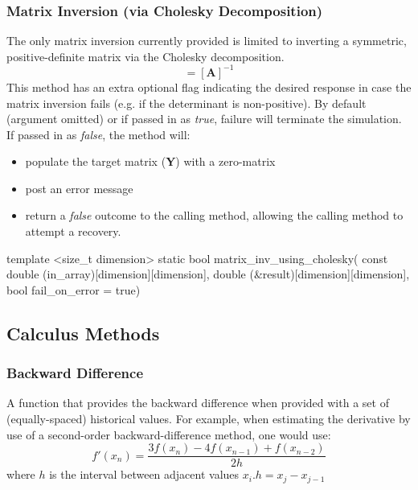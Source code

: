 \documentclass[11pt,fleqn]{report}
\begin{document}
\subsubsection{Matrix Inversion (via Cholesky Decomposition)}
The only matrix inversion currently provided is limited to inverting a
symmetric, positive-definite matrix via the Cholesky decomposition.
\begin{equation*}
[\textbf{Y}] = [\textbf{A}]^{-1}
\end{equation*}
This method has an extra optional flag indicating the desired response in
case the matrix inversion fails (e.g. if the
determinant is non-positive). By default (argument omitted) or if passed in as
\textit{true}, failure will terminate the simulation.
If passed in as \textit{false}, the method will:
\begin{itemize}
 \item populate the target matrix (\textbf{Y}) with a zero-matrix
 \item post an error message
 \item return a \textit{false} outcome to the calling method, allowing the
 calling method to attempt a recovery.
\end{itemize}

\begin{code}
template <size_t dimension>
static bool matrix_inv_using_cholesky(
            const double (in_array)[dimension][dimension],
            double (&result)[dimension][dimension],
            bool fail_on_error = true)
\end{code}

\subsection{Calculus Methods}


\subsubsection{Backward Difference}
A function that provides the backward difference when provided with a set of
(equally-spaced) historical values.
For example, when estimating the derivative by use of a second-order
backward-difference method, one would use:
\begin{equation*}
f'(x_n) = \frac{3 f(x_n) - 4f(x_{n-1}) + f(x_{n-2})} {2h}
\end{equation*}
where $h$ is the interval between adjacent values $x_i$.$h = x_j - x_{j-1}$
\end{document}
